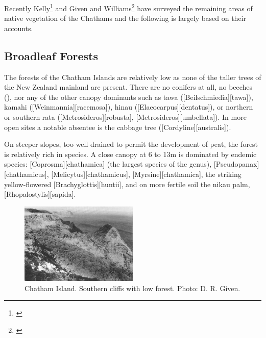 Recently Kelly\footnote{\cite{kelly1983distribution}} and Given and Williams\footnote{\cite{given1984conservation}} have surveyed the remaining areas of native vegetation of the Chathams and the following is largely based on their accounts.

\subsection{Broadleaf Forests}

The forests of the Chatham Islands are relatively low as none of the taller trees of the New Zealand mainland are present.
There are no conifers at all, no beeches (), nor any of the other canopy dominants such as tawa ([Beilschmiedia][tawa]), kamahi ([Weinmannia][racemosa]), hinau ([Elaeocarpus][dentatus]), or northern or southern rata ([Metrosideros][robusta], [Metrosideros][umbellata]).
In more open sites a notable absentee is the cabbage tree ([Cordyline][australis]).

On steeper slopes, too well drained to permit the development of peat, the forest is relatively rich in species.
A close canopy at 6 to 13m is dominated by endemic species: [Coprosma][chathamica] (the largest species of the genus), [Pseudopanax][chathamicus], [Melicytus][chathamicus], [Myrsine][chathamica], the striking yellow-flowered [Brachyglottis][huntii], and on more fertile soil the nikau palm, [Rhopalostylis][sapida].

\begin{figure}
	\includegraphics[width=0.5\textwidth]{graphics/figure118chatham-island.jpg}
	\centering
	\caption[Chatham Island, southern cliffs]{Chatham Island.
	Southern cliffs with low forest.
	Photo: D. R. Given.}%
	\label{fig:118chatham-island}
\end{figure}

